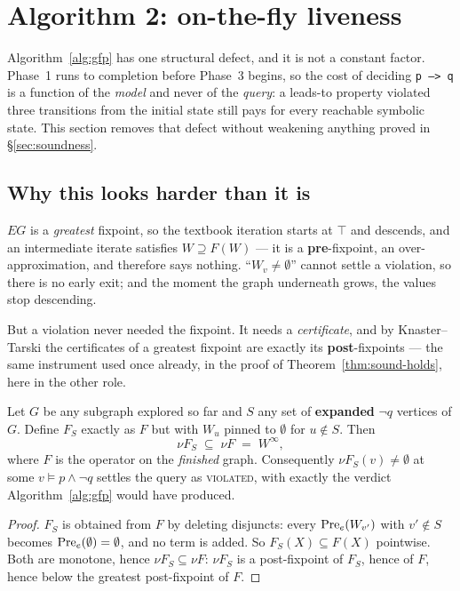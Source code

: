 \section{Algorithm 2: on-the-fly liveness}
\label{sec:otf}

Algorithm~\ref{alg:gfp} has one structural defect, and it is not a constant factor. Phase~1 runs
to completion before Phase~3 begins, so the cost of deciding \texttt{p --> q} is a function of the
\emph{model} and never of the \emph{query}: a leads-to property violated three transitions from the
initial state still pays for every reachable symbolic state. This section removes that defect
without weakening anything proved in \S\ref{sec:soundness}.

\subsection{Why this looks harder than it is}

$EG$ is a \emph{greatest} fixpoint, so the textbook iteration starts at $\top$ and descends, and an
intermediate iterate satisfies $W \supseteq F(W)$ --- it is a \textbf{pre}-fixpoint, an
over-approximation, and therefore says nothing. ``$W_v \neq \emptyset$'' cannot settle a violation,
so there is no early exit; and the moment the graph underneath grows, the values stop descending.

But a violation never needed the fixpoint. It needs a \emph{certificate}, and by Knaster--Tarski
the certificates of a greatest fixpoint are exactly its \textbf{post}-fixpoints --- the same
instrument used once already, in the proof of Theorem~\ref{thm:sound-holds}, here in the other role.

\begin{theorem}
\label{thm:fragment}
Let $G$ be any subgraph explored so far and $S$ any set of \textbf{expanded} $\lnot q$ vertices of
$G$. Define $F_S$ exactly as $F$ but with $W_u$ pinned to $\emptyset$ for $u \notin S$. Then
\[
   \nu F_S \;\subseteq\; \nu F \;=\; W^\infty,
\]
where $F$ is the operator on the \emph{finished} graph. Consequently $\nu F_S(v) \neq \emptyset$ at
some $v \models p \wedge \lnot q$ settles the query as \textsc{violated}, with exactly the verdict
Algorithm~\ref{alg:gfp} would have produced. \proved{}
\end{theorem}

\begin{proof}
$F_S$ is obtained from $F$ by deleting disjuncts: every $\mathrm{Pre}_e(W_{v'})$ with $v' \notin S$ becomes
$\mathrm{Pre}_e(\emptyset) = \emptyset$, and no term is added. So $F_S(X) \subseteq F(X)$ pointwise. Both
are monotone, hence $\nu F_S \subseteq \nu F$: $\nu F_S$ is a post-fixpoint of $F_S$, hence of $F$,
hence below the greatest post-fixpoint of $F$.
\end{proof}

